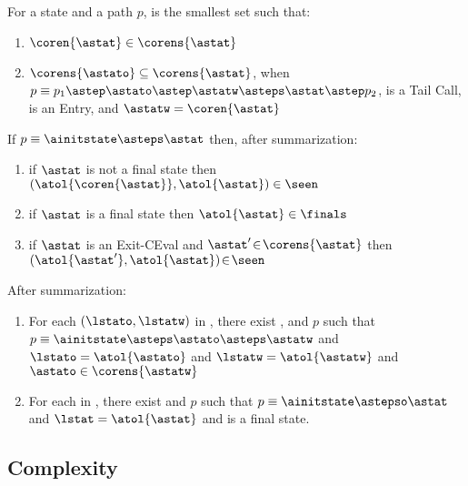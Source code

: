 \documentclass{LMCS}
\theoremstyle{definition} \newtheorem{property}[thm]{Property}
\begin{document}
\begin{defi}
  For a state {\astat} and a path $p$, \corens{\astat} is the
  smallest set such that: 
  \begin{enumerate}[$\bullet$]
  \item
    $\coren{\astat} \in \corens{\astat}$
  \item
    $\corens{\astato} \subseteq \corens{\astat}$,
    when $p \equiv p_1 \astep \astato \astep \astatw \asteps \astat 
    \astep p_2$, \astato{} is a Tail Call,
    \astatw{} is an Entry, and $\astatw = \coren{\astat}$
  \end{enumerate}
\end{defi}
\begin{thm}[Soundness]\label{thm:sum/tion-sound} 
  If $p \equiv \ainitstate \asteps \astat$ then, after summarization:
  \begin{enumerate}[$\bullet$]
  \item
    if $\astat$ is not a final state then
    $(\atol{\coren{\astat}}, \atol{\astat}) \in \seen$
  \item
    if $\astat$ is a final state then $\atol{\astat} \in \finals$
  \item
    if $\astat$ is an Exit-CEval and $\astat' \!\in\! \corens{\astat}$
    then $(\atol{\astat'}, \atol{\astat}) \!\in\! \seen$
  \end{enumerate}
\end{thm}
\begin{thm}[Completeness]\label{thm:sum/tion-complete} 
  After summarization:
  \begin{enumerate}[$\bullet$]
  \item
    For each $(\lstato, \lstatw)$ in \seen,
    there exist \astato, \astatw{} and $p$ such that 
    $p \equiv \ainitstate \asteps \astato \asteps \astatw$ \;and\; 
    $\lstato = \atol{\astato}$ \;and\;
    $\lstatw = \atol{\astatw}$ \;and\;
    $\astato \in \corens{\astatw}$
  \item
    For each \lstat{} in \finals, 
    there exist \astat{} and $p$ such that 
    $p \equiv \ainitstate \astepso \astat$ \;and\;
    $\lstat = \atol{\astat}$ \;and\;
    \astat{} is a final state.
  \end{enumerate}
\end{thm}

\subsection{Complexity\label{subsec:complexity}}
\end{document}
